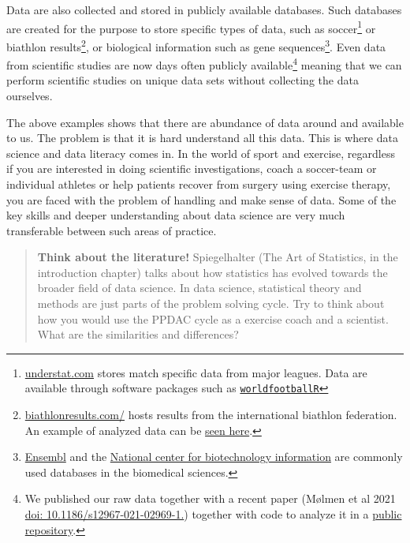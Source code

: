 \documentclass[
]{article}
\begin{document}
Data are also collected and stored in publicly available databases. Such databases are created for the purpose to store specific types of data, such as soccer\footnote{\href{https://understat.com/}{understat.com} stores match specific data from major leagues. Data are available through software packages such as \href{https://jaseziv.github.io/worldfootballR/index.html}{\texttt{worldfootballR}}} or biathlon results\footnote{\href{https://biathlonresults.com/}{biathlonresults.com/} hosts results from the international biathlon federation. An example of analyzed data can be \href{https://sciathlon.github.io/post/biathlon_data_analysis/}{seen here}.}, or biological information such as gene sequences\footnote{\href{https://www.ensembl.org/}{Ensembl} and the \href{https://www.ncbi.nlm.nih.gov/}{National center for biotechnology information} are commonly used databases in the biomedical sciences.}. Even data from scientific studies are now days often publicly available\footnote{We published our raw data together with a recent paper (Mølmen et al 2021 \href{https://translational-medicine.biomedcentral.com/articles/10.1186/s12967-021-02969-1}{doi: 10.1186/s12967-021-02969-1.}) together with code to analyze it in a \href{https://github.com/dhammarstrom/rnaseq-copd}{public repository}.} meaning that we can perform scientific studies on unique data sets without collecting the data ourselves.

The above examples shows that there are abundance of data around and available to us. The problem is that it is hard understand all this data. This is where data science and data literacy comes in. In the world of sport and exercise, regardless if you are interested in doing scientific investigations, coach a soccer-team or individual athletes or help patients recover from surgery using exercise therapy, you are faced with the problem of handling and make sense of data. Some of the key skills and deeper understanding about data science are very much transferable between such areas of practice.

\begin{quote}
\textbf{Think about the literature!}
Spiegelhalter (The Art of Statistics, in the introduction chapter) talks about how statistics has evolved towards the broader field of data science. In data science, statistical theory and methods are just parts of the problem solving cycle. Try to think about how you would use the PPDAC cycle as a exercise coach and a scientist. What are the similarities and differences?
\end{quote}
\end{document}
